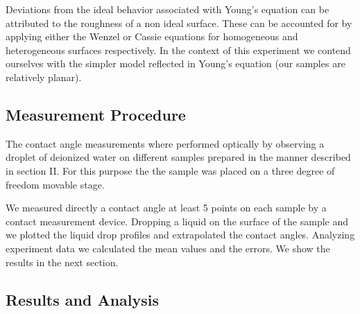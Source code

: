 Deviations from the ideal behavior associated with Young's equation can be attributed to the roughness of a non ideal surface. These can be accounted for by applying either the Wenzel or Cassie equations for homogeneous and heterogeneous surfaces respectively. In the context of this experiment we contend ourselves with the simpler model reflected in Young's equation (our samples are relatively planar).

\subsection{Measurement Procedure}

The contact angle measurements where performed optically by observing a droplet of deionized water on different samples prepared in the manner described in section II. For this purpose the the sample was placed on a three degree of freedom movable stage. 

We measured directly a contact angle at least 5 points on each sample by a contact measurement device. Dropping a liquid on the surface of the sample and we plotted the liquid drop profiles and extrapolated the contact angles. Analyzing experiment data we calculated the mean values and the errors. We show the results in the next section.

\subsection{Results and Analysis}